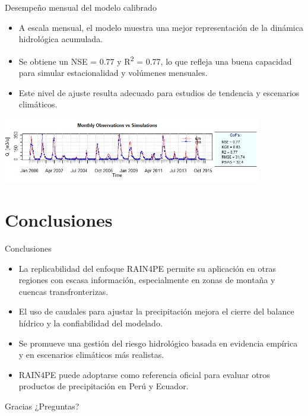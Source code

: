 \documentclass{beamer}
\begin{document}
\begin{frame}{Desempeño mensual del modelo calibrado}
  \small
  \begin{itemize}
    \item A escala mensual, el modelo muestra una mejor representación de la dinámica hidrológica acumulada.
    \item Se obtiene un NSE = 0.77 y R\textsuperscript{2} = 0.77, lo que refleja una buena capacidad para simular estacionalidad y volúmenes mensuales.
    \item Este nivel de ajuste resulta adecuado para estudios de tendencia y escenarios climáticos.
  \end{itemize}
  \vspace{0.2cm}
  \begin{center}
    \includegraphics[width=0.85\textwidth]{calibracion_actual_mensual.png}
  \end{center}
\end{frame}


\section{Conclusiones}
\begin{frame}{Conclusiones}
  \small
  \begin{itemize}
    \item La replicabilidad del enfoque RAIN4PE permite su aplicación en otras regiones con escasa información, especialmente en zonas de montaña y cuencas transfronterizas.
    \item El uso de caudales para ajustar la precipitación mejora el cierre del balance hídrico y la confiabilidad del modelado.
    \item Se promueve una gestión del riesgo hidrológico basada en evidencia empírica y en escenarios climáticos más realistas.
    \item RAIN4PE puede adoptarse como referencia oficial para evaluar otros productos de precipitación en Perú y Ecuador.
  \end{itemize}
\end{frame}


\begin{frame}{Gracias}
  \centering
  \Large ¿Preguntas?
\end{frame}
\end{document}
